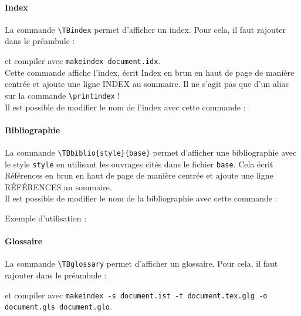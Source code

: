\paragraph{Index}

La commande \verb!\TBindex! permet d'afficher un index. Pour cela, il faut rajouter dans le préambule :
\begin{latex}
	\usepackage{makeidx}
	\makeindex
\end{latex}
et compiler avec \texttt{makeindex document.idx}. \\

Cette commande affiche l'index, écrit \og Index \fg{} en brun en haut de page de manière centrée et ajoute une ligne \og INDEX \fg{} au sommaire. Il ne s'agit pas que d'un alias sur la commande \verb!\printindex! !\\

Il est possible de modifier le nom de l'index avec cette commande :
\begin{latex}
	\renewcommand{\TBindexname}{Mon index}
\end{latex}

\paragraph{Bibliographie}

La commande \verb!\TBbiblio{style}{base}! permet d'afficher une bibliographie avec le style \texttt{style} en utilisant les ouvrages cités dans le fichier \texttt{base}. Cela écrit \og Références \fg{} en brun en haut de page de manière centrée et ajoute une ligne \og RÉFÉRENCES \fg{} au sommaire.\\

Il est possible de modifier le nom de la bibliographie avec cette commande :
\begin{latex}
	\renewcommand{\TBbiblioname}{Bibliographie}
\end{latex} \bigskip

Exemple d'utilisation :
\begin{latex}
\end{latex}

\paragraph{Glossaire}

La commande \verb!\TBglossary! permet d'afficher un glossaire. Pour cela, il faut rajouter dans le préambule :
\begin{latex}
	\usepackage[style...]{glossaries}
	\makeglossaries
\end{latex}
et compiler avec \texttt{makeindex -s document.ist -t document.tex.glg -o\\ document.gls document.glo}.\\


